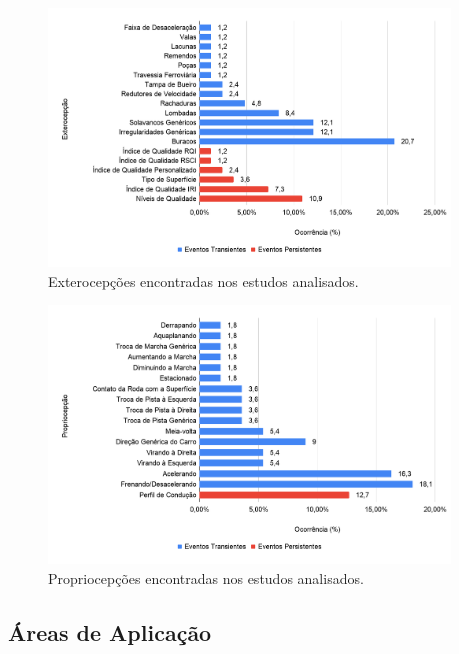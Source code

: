 \begin{figure}[h!]
  \centering
  \caption{Exterocepções encontradas nos estudos analisados.}
   \label{fig:exteroperception_occurrence}
   \includegraphics[width=0.95\textwidth]{figuras/fig_20.png}
\end{figure}

\begin{figure}[h!]
  \centering
  \caption{Propriocepções encontradas nos estudos analisados.}
   \label{fig:proprioception_occurrence}
   \includegraphics[width=0.95\textwidth]{figuras/fig_21.png}
\end{figure}

\subsection{Áreas de Aplicação}

